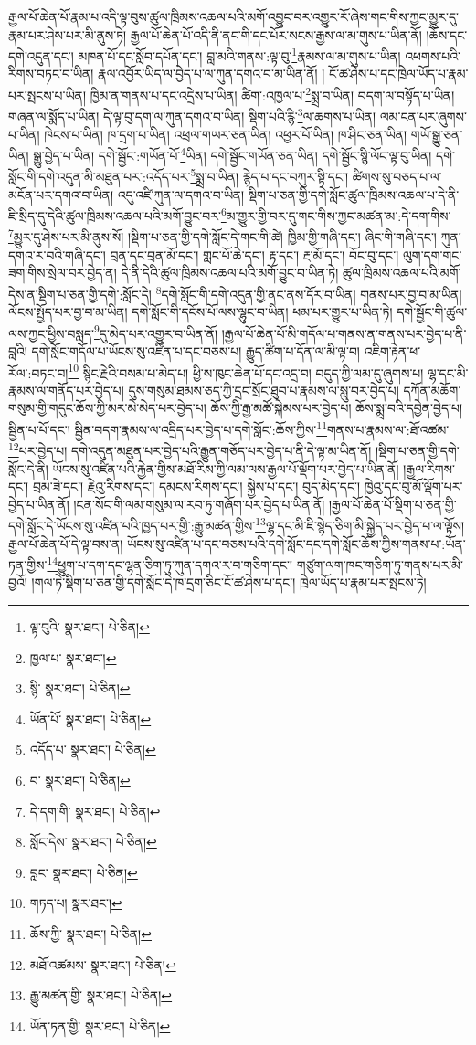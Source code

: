 རྒྱལ་པོ་ཆེན་པོ་རྣམ་པ་འདི་ལྟ་བུས་ཚུལ་ཁྲིམས་འཆལ་པའི་མགོ་འབྱུང་བར་འགྱུར་རོ་ཞེས་གང་གིས་ཀྱང་མྱུར་དུ་རྣམ་པར་ཤེས་པར་མི་ནུས་ཏེ། རྒྱལ་པོ་ཆེན་པོ་འདི་ནི་ནང་གི་དང་པོར་སངས་རྒྱས་ལ་མ་གུས་པ་ཡིན་ནོ། །ཆོས་དང་དགེ་འདུན་དང་། མཁན་པོ་དང་སློབ་དཔོན་དང་། བླ་མའི་གནས་:ལྟ་བུ་\footnote{ལྟ་བུའི་  སྣར་ཐང་།  པེ་ཅིན། }རྣམས་ལ་མ་གུས་པ་ཡིན། འཕགས་པའི་རིགས་བཏང་བ་ཡིན། རྣལ་འབྱོར་ཡིད་ལ་བྱེད་པ་ལ་ཀུན་དགའ་བ་མ་ཡིན་ནོ། །
ངོ་ཚ་ཤེས་པ་དང་ཁྲེལ་ཡོད་པ་རྣམ་པར་སྤངས་པ་ཡིན། ཁྱིམ་ན་གནས་པ་དང་འདྲེས་པ་ཡིན། ཚིག་:འཁྱལ་པ་\footnote{ཁྱལ་པ་  སྣར་ཐང་། }སྨྲ་བ་ཡིན། བདག་ལ་བསྟོད་པ་ཡིན། གཞན་ལ་སྨོད་པ་ཡིན། དེ་ལྟ་བུ་དག་ལ་ཀུན་དགའ་བ་ཡིན། སྡིག་པའི་རྙི་\footnote{སྙི་  སྣར་ཐང་།  པེ་ཅིན། }ལ་ཆགས་པ་ཡིན། ལམ་ངན་པར་ཞུགས་པ་ཡིན། ཁེངས་པ་ཡིན། ཁ་དྲག་པ་ཡིན། འཕྲལ་གཡར་ཅན་ཡིན། འཕྱར་པོ་ཡིན། ཁ་ཤིང་ཅན་ཡིན། གཡོ་སྒྱུ་ཅན་ཡིན། སྒྱུ་བྱེད་པ་ཡིན། དགེ་སྦྱོང་:གཡོན་པོ་\footnote{ཡོན་པོ་  སྣར་ཐང་།  པེ་ཅིན། }ཡིན། དགེ་སྦྱོང་གཡོན་ཅན་ཡིན། དགེ་སྦྱོང་སྙི་ལོང་ལྟ་བུ་ཡིན། དགེ་སློང་གི་དགེ་འདུན་མི་མཐུན་པར་:འདོད་པར་\footnote{འདོད་པ་  སྣར་ཐང་།  པེ་ཅིན། }སྨྲ་བ་ཡིན། རྙེད་པ་དང་བཀུར་སྟི་དང་། ཚིགས་སུ་བཅད་པ་ལ་མངོན་པར་དགའ་བ་ཡིན། འདུ་འཛི་ཀུན་ལ་དགའ་བ་ཡིན། སྡིག་པ་ཅན་གྱི་དགེ་སློང་ཚུལ་ཁྲིམས་འཆལ་པ་དེ་ནི་ཇི་སྲིད་དུ་དེའི་ཚུལ་ཁྲིམས་འཆལ་པའི་མགོ་བྱུང་བར་\footnote{བ་  སྣར་ཐང་།  པེ་ཅིན། }མ་གྱུར་གྱི་བར་དུ་གང་གིས་ཀྱང་མཚན་མ་:དེ་དག་གིས་\footnote{དེ་དག་གི་  སྣར་ཐང་།  པེ་ཅིན། }མྱུར་དུ་ཤེས་པར་མི་ནུས་སོ། །སྡིག་པ་ཅན་གྱི་དགེ་སློང་དེ་གང་གི་ཚེ། ཁྱིམ་གྱི་གཞི་དང་། ཞིང་གི་གཞི་དང་། ཀུན་དགའ་ར་བའི་གཞི་དང་། བྲན་དང་བྲན་མོ་དང་། གླང་པོ་ཆེ་དང་། རྟ་དང་། རྔ་མོ་དང་། བོང་བུ་དང་། ལུག་དག་གང་ཟག་གིས་སྲེལ་བར་བྱེད་ན། དེ་ནི་དེའི་ཚུལ་ཁྲིམས་འཆལ་པའི་མགོ་བྱུང་བ་ཡིན་ཏེ། ཚུལ་ཁྲིམས་འཆལ་པའི་མགོ་དེས་ན་སྡིག་པ་ཅན་གྱི་དགེ་:སློང་དེ། \footnote{སློང་དེས་  སྣར་ཐང་།  པེ་ཅིན། }དགེ་སློང་གི་དགེ་འདུན་གྱི་ནང་ནས་དོར་བ་ཡིན། གནས་པར་བྱ་བ་མ་ཡིན། ལོངས་སྤྱོད་པར་བྱ་བ་མ་ཡིན། དགེ་སློང་གི་དངོས་པོ་ལས་ལྷུང་བ་ཡིན། ཕམ་པར་གྱུར་པ་ཡིན་ཏེ། དགེ་སྦྱོང་གི་ཚུལ་ལས་ཀྱང་ཕྱིས་བསླད་\footnote{བླང་  སྣར་ཐང་།  པེ་ཅིན། }དུ་མེད་པར་འགྱུར་བ་ཡིན་ནོ། །རྒྱལ་པོ་ཆེན་པོ་མི་གདོལ་པ་གནས་ན་གནས་པར་བྱེད་པ་ནི་བླའི། དགེ་སློང་གདོལ་པ་ཡོངས་སུ་འཛིན་པ་དང་བཅས་པ། རྒྱུད་ཚིག་པ་དོན་ལ་མི་ལྟ་བ། འཇིག་རྟེན་ཕ་རོལ་:བཏང་བ།\footnote{གཏད་པ།  སྣར་ཐང་། } སྙིང་རྗེའི་བསམ་པ་མེད་པ། ཕྱི་ས་ཁུང་ཆེན་པོ་དང་འདྲ་བ། བདུད་ཀྱི་ལམ་དུ་ཞུགས་པ། ལྷ་དང་མི་རྣམས་ལ་གནོད་པར་བྱེད་པ། དུས་གསུམ་ཐམས་ཅད་ཀྱི་དྲང་སྲོང་ཐུབ་པ་རྣམས་ལ་སླུ་བར་བྱེད་པ། དཀོན་མཆོག་གསུམ་གྱི་གདུང་ཆོས་ཀྱི་མར་མེ་མེད་པར་བྱེད་པ། ཆོས་ཀྱི་རྒྱ་མཚོ་སྐེམས་པར་བྱེད་པ། ཆོས་སྨྲ་བའི་དབྱེན་བྱེད་པ། སྦྱིན་པ་པོ་དང་། སྦྱིན་བདག་རྣམས་ལ་འདྲིད་པར་བྱེད་པ་དགེ་སློང་:ཆོས་ཀྱིས་\footnote{ཆོས་ཀྱི་  སྣར་ཐང་།  པེ་ཅིན། }གནས་པ་རྣམས་ལ་:ཐོ་འཚམ་\footnote{མཐོ་འཚམས་  སྣར་ཐང་།  པེ་ཅིན། }པར་བྱེད་པ། དགེ་འདུན་མཐུན་པར་བྱེད་པའི་རྒྱུན་གཅོད་པར་བྱེད་པ་ནི་དེ་ལྟ་མ་ཡིན་ནོ། །སྡིག་པ་ཅན་གྱི་དགེ་སློང་དེ་ནི། ཡོངས་སུ་འཛིན་པའི་རྐྱེན་གྱིས་མཐོ་རིས་ཀྱི་ལམ་ལས་རྒྱལ་པོ་ལྡོག་པར་བྱེད་པ་ཡིན་ནོ། །རྒྱལ་རིགས་དང་། བྲམ་ཟེ་དང་། རྗེའུ་རིགས་དང་། དམངས་རིགས་དང་། སྐྱེས་པ་དང་། བུད་མེད་དང་། ཁྱེའུ་དང་བུ་མོ་ལྡོག་པར་བྱེད་པ་ཡིན་ནོ། །ངན་སོང་གི་ལམ་གསུམ་ལ་རབ་ཏུ་གཞོག་པར་བྱེད་པ་ཡིན་ནོ། །རྒྱལ་པོ་ཆེན་པོ་སྡིག་པ་ཅན་གྱི་དགེ་སློང་དེ་ཡོངས་སུ་འཛིན་པའི་ཁྱད་པར་གྱི་:རྒྱུ་མཚན་གྱིས་\footnote{རྒྱུ་མཚན་གྱི་  སྣར་ཐང་།  པེ་ཅིན། }ལྷ་དང་མི་ཇི་སྙེད་ཅིག་མི་སྐྱེད་པར་བྱེད་པ་ལ་ལྟོས། རྒྱལ་པོ་ཆེན་པོ་དེ་ལྟ་བས་ན། ཡོངས་སུ་འཛིན་པ་དང་བཅས་པའི་དགེ་སློང་དང་དགེ་སློང་ཆོས་ཀྱིས་གནས་པ་:ཡོན་ཏན་གྱིས་\footnote{ཡོན་ཏན་གྱི་  སྣར་ཐང་།  པེ་ཅིན། }ཕྱུག་པ་དག་དང་ལྷན་ཅིག་ཏུ་ཀུན་དགའ་ར་བ་གཅིག་དང་། གཙུག་ལག་ཁང་གཅིག་ཏུ་གནས་པར་མི་བྱའོ། །གལ་ཏེ་སྡིག་པ་ཅན་གྱི་དགེ་སློང་དེ་ཁ་དྲག་ཅིང་ངོ་ཚ་ཤེས་པ་དང་། ཁྲེལ་ཡོད་པ་རྣམ་པར་སྤངས་ཏེ། 